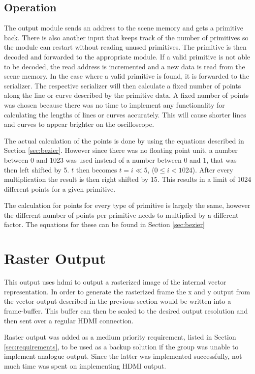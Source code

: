 \subsection{Operation}

The output module sends an address to the scene memory and gets a primitive back.
There is also another input that keeps track of the number of primitives so the module can restart without reading unused primitives.
The primitive is then decoded and forwarded to the appropriate module.
If a valid primitive is not able to be decoded, the read address is incremented and a new data is read from the scene memory.
In the case where a valid primitive is found, it is forwarded to the serializer.
The respective serializer will then calculate a fixed number of points along the line or curve described by the primitive data.
A fixed number of points was chosen because there was no time to implement any functionality for calculating the lengths of lines or curves accurately.
This will cause shorter lines and curves to appear brighter on the oscilloscope.

The actual calculation of the points is done by using the equations described in Section \ref{sec:bezier}.
However since there was no floating point unit, a number between 0 and 1023 was used instead of a number between 0 and 1, that was then left shifted by 5.
\(t\) then becomes \(t = i \ll 5\), (\(0 \leq i < 1024\)).
After every multiplication the result is then right shifted by 15.
This results in a limit of 1024 different points for a given primitive.

The calculation for points for every type of primitive is largely the same, however the different number of points per primitive needs to multiplied by a different factor.
The equations for these can be found in Section \ref{sec:bezier}

\section{Raster Output}

This output uses \gls{hdmi} to output a rasterized image of the internal vector representation.
In order to generate the rasterized frame the x and y output from the vector output described in the previous section would be written into a frame-buffer.
This buffer can then be scaled to the desired output resolution and then sent over a regular HDMI connection.

Raster output was added as a medium priority requirement, listed in Section \ref{sec:requirements}, to be used as a backup solution if the group was unable to implement analogue output.
Since the latter was implemented successfully, not much time was spent on implementing HDMI output.

